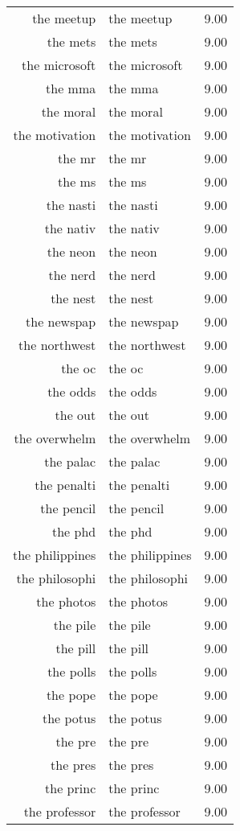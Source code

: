 \begin{table}[ht]
\begin{tabular}{rlr}
  the meetup & the meetup & 9.00 \\ 
  the mets & the mets & 9.00 \\ 
  the microsoft & the microsoft & 9.00 \\ 
  the mma & the mma & 9.00 \\ 
  the moral & the moral & 9.00 \\ 
  the motivation & the motivation & 9.00 \\ 
  the mr & the mr & 9.00 \\ 
  the ms & the ms & 9.00 \\ 
  the nasti & the nasti & 9.00 \\ 
  the nativ & the nativ & 9.00 \\ 
  the neon & the neon & 9.00 \\ 
  the nerd & the nerd & 9.00 \\ 
  the nest & the nest & 9.00 \\ 
  the newspap & the newspap & 9.00 \\ 
  the northwest & the northwest & 9.00 \\ 
  the oc & the oc & 9.00 \\ 
  the odds & the odds & 9.00 \\ 
  the out & the out & 9.00 \\ 
  the overwhelm & the overwhelm & 9.00 \\ 
  the palac & the palac & 9.00 \\ 
  the penalti & the penalti & 9.00 \\ 
  the pencil & the pencil & 9.00 \\ 
  the phd & the phd & 9.00 \\ 
  the philippines & the philippines & 9.00 \\ 
  the philosophi & the philosophi & 9.00 \\ 
  the photos & the photos & 9.00 \\ 
  the pile & the pile & 9.00 \\ 
  the pill & the pill & 9.00 \\ 
  the polls & the polls & 9.00 \\ 
  the pope & the pope & 9.00 \\ 
  the potus & the potus & 9.00 \\ 
  the pre & the pre & 9.00 \\ 
  the pres & the pres & 9.00 \\ 
  the princ & the princ & 9.00 \\ 
  the professor & the professor & 9.00 \\ 

\end{tabular}
\end{table}
